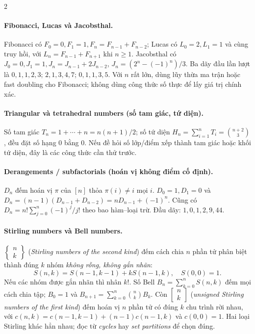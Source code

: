 \begin{multicols}{2}
\paragraph{Fibonacci, Lucas và Jacobsthal.}
Fibonacci có $F_0=0,F_1=1,F_n=F_{n-1}+F_{n-2}$;
Lucas có $L_0=2,L_1=1$ và cùng truy hồi, với
$L_n=F_{n-1}+F_{n+1}$ khi $n\ge1$.
Jacobsthal có $J_0=0,J_1=1,J_n=J_{n-1}+2J_{n-2}$,
$J_n=(2^n-(-1)^n)/3$.
Ba dãy đầu lần lượt là $0,1,1,2,3$;
$2,1,3,4,7$; $0,1,1,3,5$.
Với $n$ rất lớn, dùng lũy thừa ma trận hoặc fast doubling
cho Fibonacci; không dùng công thức số thực để lấy giá trị chính xác.

\paragraph{Triangular và tetrahedral numbers (số tam giác, tứ diện).}
Số tam giác $T_n=1+\cdots+n=n(n+1)/2$; số tứ diện
$H_n=\sum_{i=1}^nT_i=\binom{n+2}{3}$, đều đặt số hạng $0$ bằng $0$.
Nếu đề hỏi số lớp/điểm xếp thành tam giác hoặc khối tứ diện,
đây là các công thức cần thử trước.

\paragraph{Derangements / subfactorials (hoán vị không điểm cố định).}
$D_n$ đếm hoán vị $\pi$ của $[n]$ thỏa $\pi(i)\ne i$ mọi $i$.
$D_0=1,D_1=0$ và
$D_n=(n-1)(D_{n-1}+D_{n-2})=nD_{n-1}+(-1)^n$.
Cũng có $D_n=n!\sum_{j=0}^n(-1)^j/j!$ theo bao hàm--loại trừ.
Đầu dãy: $1,0,1,2,9,44$.

\paragraph{Stirling numbers và Bell numbers.}
$\left\{\begin{smallmatrix}n\\k\end{smallmatrix}\right\}$
(\emph{Stirling numbers of the second kind}) đếm cách chia
$n$ phần tử phân biệt thành đúng $k$ nhóm \emph{không rỗng,
không gắn nhãn}:
\[
S(n,k)=S(n-1,k-1)+kS(n-1,k),\quad S(0,0)=1.
\]
Nếu các nhóm được gắn nhãn thì nhân $k!$.
Số Bell $B_n=\sum_{k=0}^n S(n,k)$ đếm mọi cách chia tập;
$B_0=1$ và $B_{n+1}=\sum_{k=0}^n\binom nk B_k$.
Còn $\left[\begin{smallmatrix}n\\k\end{smallmatrix}\right]$
(\emph{unsigned Stirling numbers of the first kind}) đếm hoán vị
$n$ phần tử có đúng $k$ chu trình rời nhau, với
$c(n,k)=c(n-1,k-1)+(n-1)c(n-1,k)$ và $c(0,0)=1$.
Hai loại Stirling khác hẳn nhau; đọc từ \emph{cycles} hay
\emph{set partitions} để chọn đúng.


\end{multicols}
